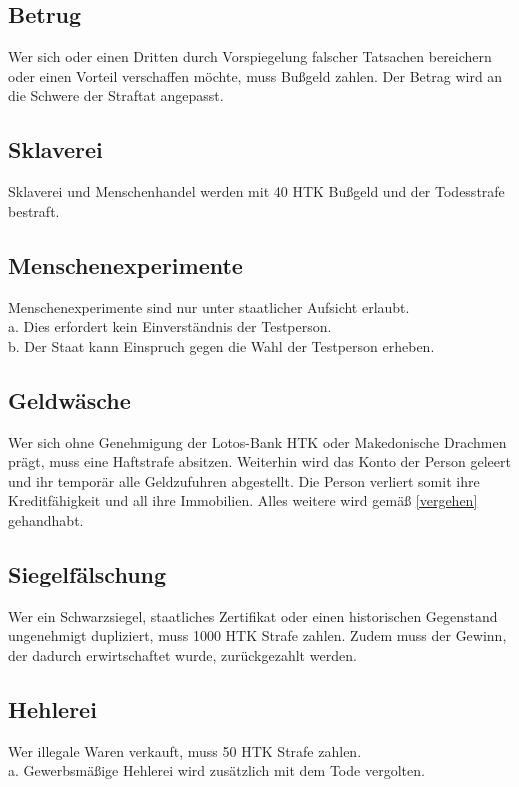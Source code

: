 \documentclass{article}
\begin{document}
\subsection{Betrug}
Wer sich oder einen Dritten durch Vorspiegelung falscher Tatsachen bereichern oder einen Vorteil verschaffen möchte, muss Bußgeld zahlen. Der Betrag wird an die Schwere der Straftat angepasst.

\subsection{Sklaverei}
Sklaverei und Menschenhandel werden mit 40 HTK Bußgeld und der Todesstrafe bestraft.

\subsection{Menschenexperimente}
Menschenexperimente sind nur unter staatlicher Aufsicht erlaubt.\\
a. Dies erfordert kein Einverständnis der Testperson.\\
b. Der Staat kann Einspruch gegen die Wahl der Testperson erheben.

\subsection{Geldwäsche}
Wer sich ohne Genehmigung der Lotos-Bank HTK oder Makedonische Drachmen prägt, muss eine Haftstrafe absitzen. Weiterhin wird das Konto der Person geleert und ihr temporär alle Geldzufuhren abgestellt. Die Person verliert somit ihre Kreditfähigkeit und all ihre Immobilien. Alles weitere wird gemäß \ref{vergehen} gehandhabt.

\subsection{Siegelfälschung}
Wer ein Schwarzsiegel, staatliches Zertifikat oder einen historischen Gegenstand ungenehmigt dupliziert, muss 1000 HTK Strafe zahlen. Zudem muss der Gewinn, der dadurch erwirtschaftet wurde, zurückgezahlt werden.

\subsection{Hehlerei}
Wer illegale Waren verkauft, muss 50 HTK Strafe zahlen.\\
a. Gewerbsmäßige Hehlerei wird zusätzlich mit dem Tode vergolten.
\end{document}
